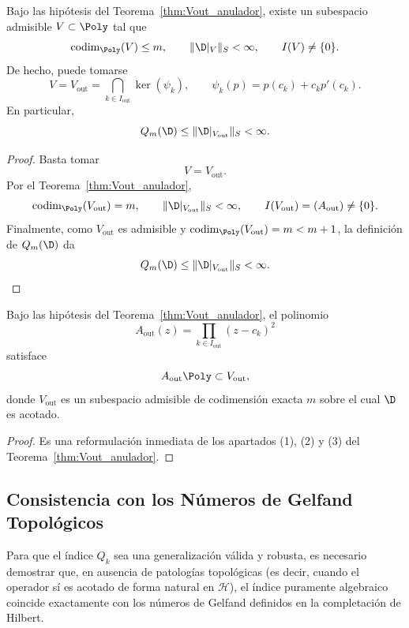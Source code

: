 \begin{cor}
	\label{cor:existencia_V_estable_anulador}
	Bajo las hipótesis del Teorema~\ref{thm:Vout_anulador}, existe un subespacio admisible
	$V\subset \Poly$ tal que
	\[
		\operatorname{codim}_{\Poly}(V)\le m,
		\qquad
		\|\D|_V\|_S<\infty,
		\qquad
		I(V)\neq \{0\}.
	\]
	De hecho, puede tomarse
	\[
		V=V_{\mathrm{out}}=\bigcap_{k\in I_{\mathrm{out}}}\ker(\psi_k),
		\qquad
		\psi_k(p)=p(c_k)+c_kp'(c_k).
	\]
	En particular,
	\[
		Q_m(\D)\le \|\D|_{V_{\mathrm{out}}}\|_S<\infty.
	\]
\end{cor}

\begin{proof}
	Basta tomar
	\[
		V=V_{\mathrm{out}}.
	\]
	Por el Teorema~\ref{thm:Vout_anulador},
	\[
		\operatorname{codim}_{\Poly}(V_{\mathrm{out}})=m,
		\qquad
		\|\D|_{V_{\mathrm{out}}}\|_S<\infty,
		\qquad
		I(V_{\mathrm{out}})=(A_{\mathrm{out}})\neq\{0\}.
	\]
	Finalmente, como $V_{\mathrm{out}}$ es admisible y $\operatorname{codim}_{\Poly}(V_{\mathrm{out}})=m< m+1$,
	la definición de $Q_m(\D)$ da
	\[
		Q_m(\D)\le \|\D|_{V_{\mathrm{out}}}\|_S<\infty.
	\]
\end{proof}

\begin{cor}
	\label{cor:anulador_canonico_umbral}
	Bajo las hipótesis del Teorema~\ref{thm:Vout_anulador}, el polinomio
	\[
		A_{\mathrm{out}}(z)=\prod_{k\in I_{\mathrm{out}}}(z-c_k)^2
	\]
	satisface
	\[
		A_{\mathrm{out}}\Poly\subset V_{\mathrm{out}},
	\]
	donde $V_{\mathrm{out}}$ es un subespacio admisible de codimensión exacta $m$
	sobre el cual $\D$ es acotado.
\end{cor}

\begin{proof}
	Es una reformulación inmediata de los apartados (1), (2) y (3) del
	Teorema~\ref{thm:Vout_anulador}.
\end{proof}

\subsection{Consistencia con los Números de Gelfand Topológicos}

Para que el índice $Q_k$ sea una generalización válida y robusta, es necesario demostrar que, en ausencia de patologías topológicas (es decir, cuando el operador sí es acotado de forma natural en $\mathcal{H}$), el índice puramente algebraico coincide exactamente con los números de Gelfand definidos en la completación de Hilbert.

